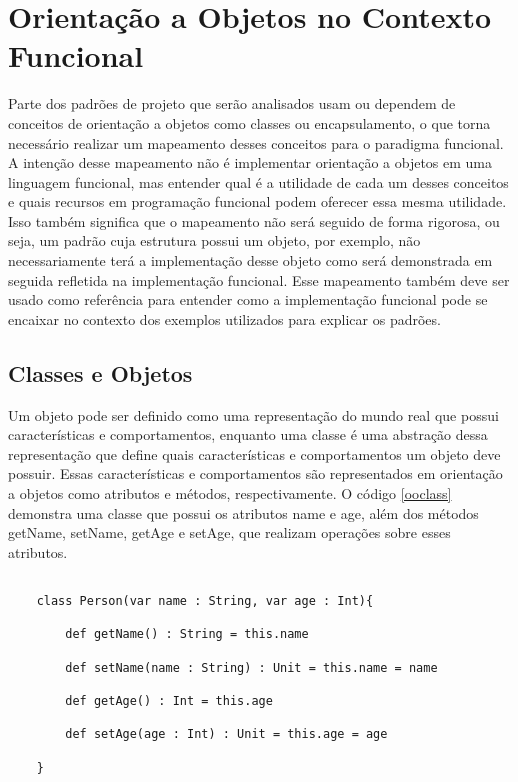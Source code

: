 
\chapter{Orientação a Objetos no Contexto Funcional}


Parte dos padrões de projeto que serão 
analisados usam ou dependem de conceitos 
de orientação a objetos como classes ou 
encapsulamento, o que torna necessário 
realizar um mapeamento desses conceitos 
para o paradigma funcional. A intenção 
desse mapeamento não é implementar 
orientação a objetos em uma linguagem 
funcional, mas entender qual é a utilidade 
de cada um desses conceitos e quais 
recursos em programação funcional podem 
oferecer essa mesma utilidade. Isso também 
significa que o mapeamento não será seguido 
de forma rigorosa, ou seja, um padrão 
cuja estrutura possui um objeto, por 
exemplo, não necessariamente terá a 
implementação desse objeto como será 
demonstrada em seguida refletida 
na implementação funcional. Esse 
mapeamento também deve ser usado como 
referência para entender como a 
implementação funcional pode se encaixar 
no contexto dos exemplos utilizados 
para explicar os padrões. 


\section{Classes e Objetos}

Um objeto pode ser definido como uma representação 
do mundo real que possui características e comportamentos, 
enquanto uma classe é uma abstração dessa representação 
que define quais características e comportamentos um objeto 
deve possuir\cite{umlsystems}. Essas características 
e comportamentos são representados em orientação a 
objetos como atributos e métodos, respectivamente. 
O código \ref{ooclass} demonstra uma classe que 
possui os atributos name e age, além dos métodos 
getName, setName, getAge e setAge, que realizam 
operações sobre esses atributos.

\begin{lstlisting}[caption={Classe comum em Orientação a Objetos},label=ooclass]
    
    class Person(var name : String, var age : Int){

        def getName() : String = this.name

        def setName(name : String) : Unit = this.name = name

        def getAge() : Int = this.age

        def setAge(age : Int) : Unit = this.age = age

    }   

\end{lstlisting}

